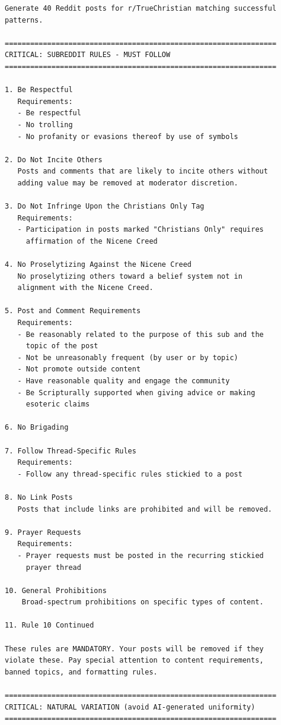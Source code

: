 \begin{small}
\begin{verbatim}
Generate 40 Reddit posts for r/TrueChristian matching successful 
patterns.

================================================================
CRITICAL: SUBREDDIT RULES - MUST FOLLOW
================================================================

1. Be Respectful
   Requirements:
   - Be respectful
   - No trolling
   - No profanity or evasions thereof by use of symbols

2. Do Not Incite Others
   Posts and comments that are likely to incite others without 
   adding value may be removed at moderator discretion.

3. Do Not Infringe Upon the Christians Only Tag
   Requirements:
   - Participation in posts marked "Christians Only" requires 
     affirmation of the Nicene Creed

4. No Proselytizing Against the Nicene Creed
   No proselytizing others toward a belief system not in 
   alignment with the Nicene Creed.

5. Post and Comment Requirements
   Requirements:
   - Be reasonably related to the purpose of this sub and the 
     topic of the post
   - Not be unreasonably frequent (by user or by topic)
   - Not promote outside content
   - Have reasonable quality and engage the community
   - Be Scripturally supported when giving advice or making 
     esoteric claims

6. No Brigading

7. Follow Thread-Specific Rules
   Requirements:
   - Follow any thread-specific rules stickied to a post

8. No Link Posts
   Posts that include links are prohibited and will be removed.

9. Prayer Requests
   Requirements:
   - Prayer requests must be posted in the recurring stickied 
     prayer thread

10. General Prohibitions
    Broad-spectrum prohibitions on specific types of content.

11. Rule 10 Continued

These rules are MANDATORY. Your posts will be removed if they 
violate these. Pay special attention to content requirements, 
banned topics, and formatting rules.

================================================================
CRITICAL: NATURAL VARIATION (avoid AI-generated uniformity)
================================================================


\end{verbatim}
\end{small}
